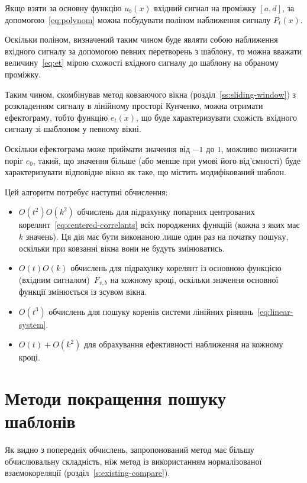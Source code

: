     Якщо взяти за основну функцію $u_b(x)$ вхідний сигнал на проміжку ${[a,d]}$, за допомогою~\eqref{eq:polynom} можна
    побудувати поліном наближення сигналу $P_t(x)$.

    Оскільки поліном, визначений таким чином буде являти собою наближення вхідного сигналу за допомогою певних
    перетворень з шаблону, то можна вважати величину~\eqref{eq:et} мірою схожості вхідного сигналу до шаблону на
    обраному проміжку.

    Таким чином, скомбінував метод ковзаючого вікна (розділ~\ref{ss:sliding-window}) з розкладенням сигналу в
    лінійному просторі Кунченко, можна отримати ефектограму, тобто функцію $e_t(x)$, що буде характеризувати схожість
    вхідного сигналу зі шаблоном у певному вікні.

    Оскільки ефектограма може приймати значення від $-1$ до $1$, можливо визначити поріг $e_0$, такий, що значення
    більше (або менше при умові його від’ємності) буде характеризувати відповідне вікно як таке, що містить
    модифікований шаблон.

    Цей алгоритм потребує наступні обчислення:
    \begin{itemize}
        \item $O(t^2) O(k^2)$ обчислень для підрахунку попарних центрованих корелянт~\eqref{eq:centered-correlants}
            всіх породжених функцій (кожна з яких має $k$ значень).
            Ця дія має бути виконаною лише один раз на початку пошуку, оскільки при ковзанні вікна вони не будуть
            змінюватись.
        \item $O(t) O(k)$ обчислень для підрахунку корелянт із основною функцією (вхідним сигналом)~$F_{v,b}$ на
            кожному кроці, оскільки значення основної функції змінюється із зсувом вікна.
        \item $O(t^3)$ обчислень для пошуку коренів системи лінійних рівнянь~\eqref{eq:linear-system}.
        \item $O(t) + O(k^2)$ для обрахування ефективності наближення на кожному кроці.
    \end{itemize}

\section{Методи покращення пошуку шаблонів}
    Як видно з попередніх обчислень, запропонований метод має більшу обчислювальну складність, ніж метод із
    використанням нормалізованої взаємокореляції (розділ~\ref{s:existing-compare}).

